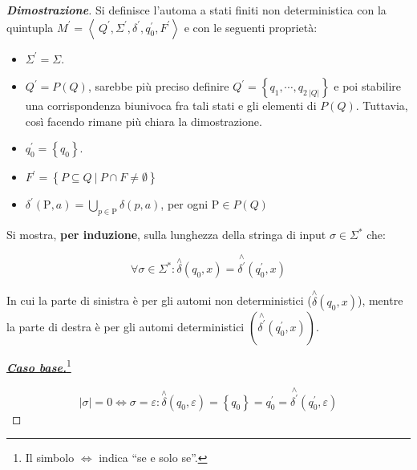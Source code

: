 \documentclass[a4paper]{article}
\newcommand{\dquotes}[1]{``#1''}
\begin{document}
	\begin{proof}[\textbf{Dimostrazione}]
		Si definisce l'automa a stati finiti non deterministica con la quintupla $M^{'} = \left\langle\ Q^{'}, \Sigma^{'}, \delta^{'}, q_{0}^{'}, F^{'} \right\rangle$ e con le seguenti proprietà:
		
		\begin{itemize}
			\item[\ding{72}] $\Sigma^{'} = \Sigma$.
			
			\item[\ding{72}] $Q^{'} = P(Q)$, sarebbe più preciso definire $Q^{'} = \left\{q_{1}, \cdots, q_{2\: |Q|}\right\}$ e poi stabilire una corrispondenza biunivoca fra tali stati e gli elementi di $P(Q)$. Tuttavia, così facendo rimane più chiara la dimostrazione.
			
			\item[\ding{72}] $q_{0}^{'} = \left\{q_{0}\right\}$.
			
			\item[\ding{72}] $F^{'} = \left\{P \subseteq Q \: | \: P \cap F \ne \emptyset\right\}$
			
			\item[\ding{72}] $\delta^{'}\left(\mathrm{P}, a\right) = \bigcup_{p \in \mathrm{P}} \delta \left(p, a\right)$, per ogni $\mathrm{P} \in P(Q)$
		\end{itemize}
	
		Si mostra, \textbf{per induzione}, sulla lunghezza della stringa di input $\sigma \in \Sigma^{*}$ che:
		
		\begin{equation}\label{induzione rabin-scott}
			\forall \sigma \in \Sigma^{*} : \overset{\wedge}{\delta} \left(q_{0}, x\right) = \overset{\wedge}{\delta^{'}} \left(q_{0}^{'}, x\right)
		\end{equation}
	
		\noindent
		In cui la parte di sinistra è per gli automi non deterministici ($\overset{\wedge}{\delta} \left(q_{0}, x\right)$), mentre la parte di destra è per gli automi deterministici $\left(\overset{\wedge}{\delta^{'}} \left(q_{0}^{'}, x\right)\right)$.\newline
		
		\noindent
		\textbf{\emph{\underline{Caso base.}}}\footnote{Il simbolo $\iff$ indica \dquotes{se e solo se}.}
		
		\begin{equation*}
			|\sigma| = 0 \iff \sigma = \varepsilon : \overset{\wedge}{\delta} \left(q_{0}, \varepsilon\right) = \left\{q_{0}\right\} = q^{'}_{0} = \overset{\wedge}{\delta^{'}} \left(q_{0}^{'}, \varepsilon\right)
		\end{equation*}
	

\end{proof}
\end{document}
